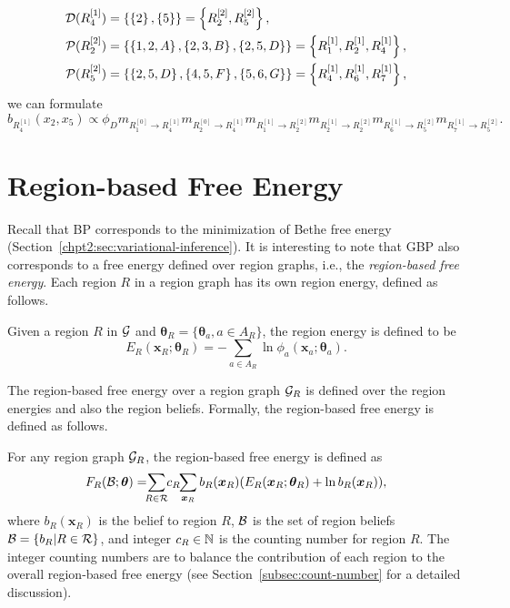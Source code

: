 \begin{example}
\begin{align*}
      \mathcal{D}(R^{[1]}_4)  &= \left\{ \left\{ 2 \right\}, \left\{ 5 \right\} \right\}=\left\{ R^{[2]}_2, R^{[2]}_5 \right\}, \\
      \mathcal{P}(R^{[2]}_2) &= \left\{ \left\{ 1, 2, A \right\}, \left\{ 2, 3, B \right\}, \left\{ 2, 5, D \right\} \right\} = \left\{ R^{[1]}_1, R^{[1]}_2, R^{[1]}_4 \right\}, \\
      \mathcal{P}(R^{[2]}_5) &= \left\{ \left\{ 2, 5, D \right\}, \left\{ 4, 5, F \right\}, \left\{ 5, 6, G \right\} \right\} = \left\{ R^{[1]}_4, R^{[1]}_6, R^{[1]}_7 \right\},
    \end{align*}
    we can formulate
    \begin{equation*}
      b_{R^{[1]}_4}(x_2, x_5) \propto \phi_D m_{R^{[0]}_1\rightarrow R^{[1]}_4} m_{R^{[0]}_2\rightarrow R^{[1]}_4} m_{ R^{[1]}_1\rightarrow R^{[2]}_2 } m_{ R^{[1]}_2\rightarrow R^{[2]}_2 } m_{ R^{[1]}_6 \rightarrow R^{[2]}_5} m_{R^{[1]}_7 \rightarrow R^{[2]}_5}.
      \end{equation*}
\end{example}


\section{Region-based Free Energy}
Recall that BP corresponds to the minimization of Bethe free energy (Section~\ref{chpt2:sec:variational-inference}). It is interesting to note that GBP also corresponds to a free energy defined over region graphs, i.e., the \textit{region-based free energy}.
Each region $R$ in a region graph has its own region energy, defined as follows.
\begin{definition}
  Given a region $R$ in $\mathcal{G}$ and $\bm{\theta}_R=\{\bm{\theta}_a, a\in A_R\}$, the region energy is defined to be
  \begin{equation}
    E_R(\bm{x}_R; \bm{\theta}_R) = - \sum_{a\in A_R} \ln{\phi_a(\bm{x}_a; \bm{\theta}_a)}.
  \end{equation}
\end{definition}
The region-based free energy over a region graph $\mathcal{G}_R$ is defined over the region energies and also the region beliefs. Formally, the region-based free energy is defined as follows.
\begin{definition}\label{def:region-free-energy}
  For any region graph $\mathcal{G}_R$, the region-based free energy is defined as
  \begin{equation}\label{eq:def-region-free-energy}
    F_R(\Bb; \bm{\theta}) = \hspace{-0.15cm}\sum_{R\in \Rr} \hspace{-0.1cm}c_R\hspace{-0.1cm} \sum_{\bm{x}_R}b_R(\bm{x}_R) (E_R(\bm{x}_R; \bm{\theta}_R) + \ln{b_R}(\bm{x}_R)),
  \end{equation}
  where $b_R(\bm{x}_R)$ is the belief to region $R$, $\mathcal{B}$ is the set of region beliefs $\mathcal{B} = \left\{ b_R| R \in \mathcal{R} \right\}$, and integer $c_R \in \mathbb{N}$ is the counting number for region $R$. The integer counting numbers are to balance the contribution of each region to the overall region-based free energy (see Section~\ref{subsec:count-number} for a detailed discussion).
\end{definition}


